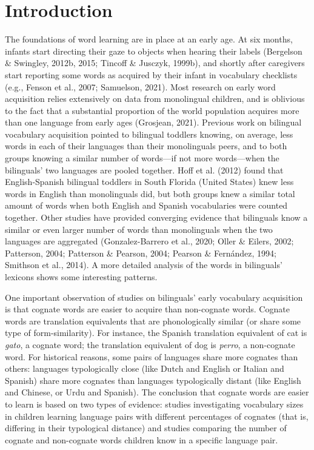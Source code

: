 \documentclass[
  12pt,
  b5paperpaper,
  twoside]{scrreprt}
\begin{document}
\hypertarget{introduction-1}{%
\section{Introduction}\label{introduction-1}}

The foundations of word learning are in place at an early age. At six
months, infants start directing their gaze to objects when hearing their
labels (Bergelson \& Swingley, 2012b, 2015; Tincoff \& Jusczyk, 1999b),
and shortly after caregivers start reporting some words as acquired by
their infant in vocabulary checklists (e.g., Fenson et al., 2007;
Samuelson, 2021). Most research on early word acquisition relies
extensively on data from monolingual children, and is oblivious to the
fact that a substantial proportion of the world population acquires more
than one language from early ages (Grosjean, 2021). Previous work on
bilingual vocabulary acquisition pointed to bilingual toddlers knowing,
on average, less words in each of their languages than their
monolinguals peers, and to both groups knowing a similar number of
words---if not more words---when the bilinguals' two languages are
pooled together. Hoff et al. (2012) found that English-Spanish bilingual
toddlers in South Florida (United States) knew less words in English
than monolinguals did, but both groups knew a similar total amount of
words when both English and Spanish vocabularies were counted together.
Other studies have provided converging evidence that bilinguals know a
similar or even larger number of words than monolinguals when the two
languages are aggregated (Gonzalez-Barrero et al., 2020; Oller \&
Eilers, 2002; Patterson, 2004; Patterson \& Pearson, 2004; Pearson \&
Fernández, 1994; Smithson et al., 2014). A more detailed analysis of the
words in bilinguals' lexicons shows some interesting patterns.

One important observation of studies on bilinguals' early vocabulary
acquisition is that cognate words are easier to acquire than non-cognate
words. Cognate words are translation equivalents that are phonologically
similar (or share some type of form-similarity). For instance, the
Spanish translation equivalent of cat is \emph{gato}, a cognate word;
the translation equivalent of dog is \emph{perro}, a non-cognate word.
For historical reasons, some pairs of languages share more cognates than
others: languages typologically close (like Dutch and English or Italian
and Spanish) share more cognates than languages typologically distant
(like English and Chinese, or Urdu and Spanish). The conclusion that
cognate words are easier to learn is based on two types of evidence:
studies investigating vocabulary sizes in children learning language
pairs with different percentages of cognates (that is, differing in
their typological distance) and studies comparing the number of cognate
and non-cognate words children know in a specific language pair.
\end{document}
